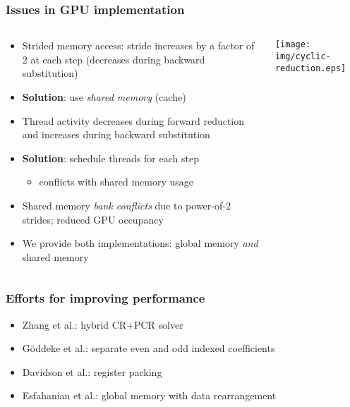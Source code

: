 \begin{frame}
\frametitle{Issues in GPU implementation}
\footnotesize
\begin{columns}
\begin{column}{0.5\textwidth}
\begin{itemize}
    \item Strided memory access:
        stride increases by a factor of 2 at each step
        (decreases during backward substitution)
    \item \textbf{Solution}: use \emph{shared memory} (cache)
    \item Thread activity decreases during forward
        reduction and increases during backward substitution
    \item \textbf{Solution}: schedule threads for each step
        \begin{itemize}
            \footnotesize
            \item conflicts with shared memory usage
        \end{itemize}
    \item Shared memory \emph{bank conflicts}
        due to power-of-2 strides; reduced GPU occupancy
    \item We provide both implementations:
        global memory \emph{and} shared memory
\end{itemize}
\end{column}
\begin{column}{0.5\textwidth}
\texttt{[image: img/cyclic-reduction.eps]}
\end{column}
\end{columns}
\end{frame}

\begin{frame}
\frametitle{Efforts for improving performance}
\begin{itemize}
    \item Zhang et al.: hybrid CR+PCR solver
    \item G{\"o}ddeke et al.: separate even and odd indexed
        coefficients
    \item Davidson et al.: register packing
    \item Esfahanian et al.: global memory with data rearrangement
\end{itemize}
\end{frame}

